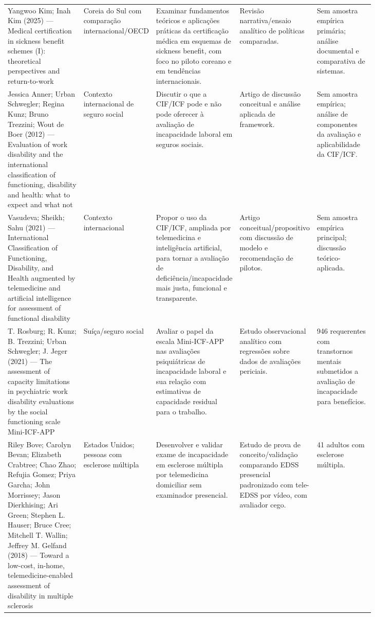 \documentclass[12pt,a4paper]{article}
\begin{document}
\begin{landscape}
\begin{longtable}{p{0.22\linewidth}p{0.11\linewidth}p{0.17\linewidth}p{0.17\linewidth}p{0.16\linewidth}}
Yangwoo Kim; Inah Kim (2025) — Medical certification in sickness benefit schemes (I): theoretical perspectives and return-to-work & Coreia do Sul com comparação internacional/OECD & Examinar fundamentos teóricos e aplicações práticas da certificação médica em esquemas de sickness benefit, com foco no piloto coreano e em tendências internacionais. & Revisão narrativa/ensaio analítico de políticas comparadas. & Sem amostra empírica primária; análise documental e comparativa de sistemas.\\
Jessica Anner; Urban Schwegler; Regina Kunz; Bruno Trezzini; Wout de Boer (2012) — Evaluation of work disability and the international classification of functioning, disability and health: what to expect and what not & Contexto internacional de seguro social & Discutir o que a CIF/ICF pode e não pode oferecer à avaliação de incapacidade laboral em seguros sociais. & Artigo de discussão conceitual e análise aplicada de framework. & Sem amostra empírica; análise de componentes da avaliação e aplicabilidade da CIF/ICF.\\
Vasudeva; Sheikh; Sahu (2021) — International Classification of Functioning, Disability, and Health augmented by telemedicine and artificial intelligence for assessment of functional disability & Contexto internacional & Propor o uso da CIF/ICF, ampliada por telemedicina e inteligência artificial, para tornar a avaliação de deficiência/incapacidade mais justa, funcional e transparente. & Artigo conceitual/propositivo com discussão de modelo e recomendação de pilotos. & Sem amostra empírica principal; discussão teórico-aplicada.\\
T. Rosburg; R. Kunz; B. Trezzini; Urban Schwegler; J. Jeger (2021) — The assessment of capacity limitations in psychiatric work disability evaluations by the social functioning scale Mini-ICF-APP & Suíça/seguro social & Avaliar o papel da escala Mini-ICF-APP nas avaliações psiquiátricas de incapacidade laboral e sua relação com estimativas de capacidade residual para o trabalho. & Estudo observacional analítico com regressões sobre dados de avaliações periciais. & 946 requerentes com transtornos mentais submetidos a avaliação de incapacidade para benefícios.\\
Riley Bove; Carolyn Bevan; Elizabeth Crabtree; Chao Zhao; Refujia Gomez; Priya Garcha; John Morrissey; Jason Dierkhising; Ari Green; Stephen L. Hauser; Bruce Cree; Mitchell T. Wallin; Jeffrey M. Gelfand (2018) — Toward a low-cost, in-home, telemedicine-enabled assessment of disability in multiple sclerosis & Estados Unidos; pessoas com esclerose múltipla & Desenvolver e validar exame de incapacidade em esclerose múltipla por telemedicina domiciliar sem examinador presencial. & Estudo de prova de conceito/validação comparando EDSS presencial padronizado com tele-EDSS por vídeo, com avaliador cego. & 41 adultos com esclerose múltipla.\\

\end{longtable}
\end{landscape}
\end{document}
